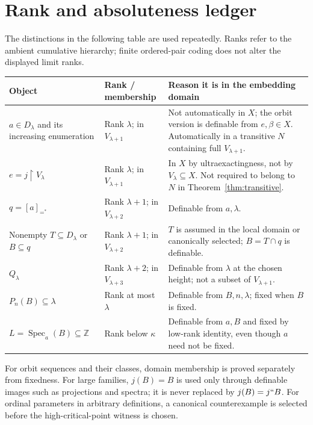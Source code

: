 \documentclass[11pt,letterpaper]{article}
\theoremstyle{definition}
\newcommand{\restr}{\mathbin{\upharpoonright}}
\numberwithin{equation}{section}
\newcommand{\ZZ}{\mathbb Z}
\newcommand{\Spec}{\operatorname{Spec}}
\begin{document}
\appendix
\section{Rank and absoluteness ledger}\label{app:ranks}

The distinctions in the following table are used repeatedly. Ranks refer to the ambient cumulative hierarchy; finite ordered-pair coding does not alter the displayed limit ranks.

\begin{center}
\small
\renewcommand{\arraystretch}{1.22}
\begin{tabularx}{\textwidth}{@{}P{.25\textwidth}P{.21\textwidth}Y@{}}
\toprule
\textbf{Object}&\textbf{Rank / membership}&\textbf{Reason it is in the embedding domain}\\\midrule
$a\in D_\lambda$ and its increasing enumeration&Rank $\lambda$; in $V_{\lambda+1}$&Not automatically in $X$; the orbit version is definable from $e,\beta\in X$. Automatically in a transitive $N$ containing full $V_{\lambda+1}$.\\
$e=j\restr V_\lambda$&Rank $\lambda$; in $V_{\lambda+1}$&In $X$ by ultraexactingness, not by $V_\lambda\subseteq X$. Not required to belong to $N$ in Theorem~\ref{thm:transitive}.\\
$q=[a]_{=^{*}}$&Rank $\lambda+1$; in $V_{\lambda+2}$&Definable from $a,\lambda$.\\
Nonempty $T\subseteq D_\lambda$ or $B\subseteq q$&Rank $\lambda+1$; in $V_{\lambda+2}$&$T$ is assumed in the local domain or canonically selected; $B=T\cap q$ is definable.\\
$Q_\lambda$&Rank $\lambda+2$; in $V_{\lambda+3}$&Definable from $\lambda$ at the chosen height; not a subset of $V_{\lambda+1}$.\\
$P_n(B)\subseteq\lambda$&Rank at most $\lambda$&Definable from $B,n,\lambda$; fixed when $B$ is fixed.\\
$L=\Spec_a(B)\subseteq\ZZ$&Rank below $\kappa$&Definable from $a,B$ and fixed by low-rank identity, even though $a$ need not be fixed.\\
\bottomrule
\end{tabularx}
\end{center}

For orbit sequences and their classes, domain membership is proved separately from fixedness. For large families, $j(B)=B$ is used only through definable images such as projections and spectra; it is never replaced by $j(B)=j``B$. For ordinal parameters in arbitrary definitions, a canonical counterexample is selected before the high-critical-point witness is chosen.
\end{document}
